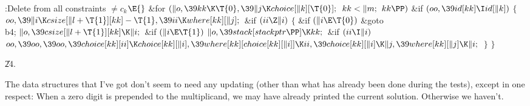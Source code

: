 \B{}:Delete 
from all constraints $\ne c_k$\X${}\E{}$\6
\&{for} ${}(\|o,\39\\{kk}\K\T{0},\39\|j\K\\{choice}[\|k][\T{0}];{}$ ${}\\{kk}<%
\|m;{}$ ${}\\{kk}\PP){}$\1\6
\&{if} ${}(\\{oo},\39\\{id}[\\{kk}]\I\\{id}[\|k]){}$\5
${}\{{}$\1\6
${}\\{oo},\39\|i\K\\{csize}[\|l+\T{1}][\\{kk}]-\T{1},\39\\{ii}\K\\{where}[%
\\{kk}][\|j];{}$\6
\&{if} ${}(\\{ii}\Z\|i){}$\5
${}\{{}$\1\6
\&{if} ${}(\|i\E\T{0}){}$\1\5
\&{goto} \\{b4};\2\6
${}\|o,\39\\{csize}[\|l+\T{1}][\\{kk}]\K\|i;{}$\6
\&{if} ${}(\|i\E\T{1}){}$\1\5
${}\|o,\39\\{stack}[\\{stackptr}\PP]\K\\{kk};{}$\2\6
\&{if} ${}(\\{ii}\I\|i){}$\1\5
${}\\{oo},\39\\{oo},\39\\{oo},\39\\{choice}[\\{kk}][\\{ii}]\K\\{choice}[%
\\{kk}][\|i],\39\\{where}[\\{kk}][\\{choice}[\\{kk}][\|i]]\K\\{ii},\39%
\\{choice}[\\{kk}][\|i]\K\|j,\39\\{where}[\\{kk}][\|j]\K\|i;{}$\2\6
\4${}\}{}$\2\6
\4${}\}{}$\2\2\par
\U24.\fi

The data structures that I've got don't
seem to need any updating
(other than what has already been done during the tests),
except in one respect: When a zero digit is prepended to the multiplicand,
we may have already printed the current solution. Otherwise we haven't.

